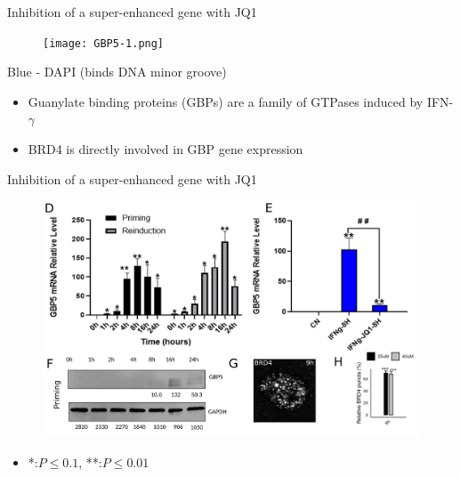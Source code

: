 \documentclass{beamer}					%
\begin{document}
\begin{frame}{Inhibition of a super-enhanced gene with JQ1}
\begin{figure}
\texttt{[image: GBP5-1.png]}
\end{figure}
Blue - DAPI (binds DNA minor groove)
\begin{itemize}
\item Guanylate binding proteins (GBPs) are a family of GTPases induced by IFN-$\gamma$
\item BRD4 is directly involved in GBP gene expression
\end{itemize}
\end{frame}

\begin{frame}{Inhibition of a super-enhanced gene with JQ1}
\begin{figure}
\includegraphics[width=12cm]{GBP5-2.png}
\end{figure}
\begin{itemize}
\item *:$P \leq 0.1$, **:$P \leq 0.01$
\end{itemize}
\end{frame}
\end{document}
